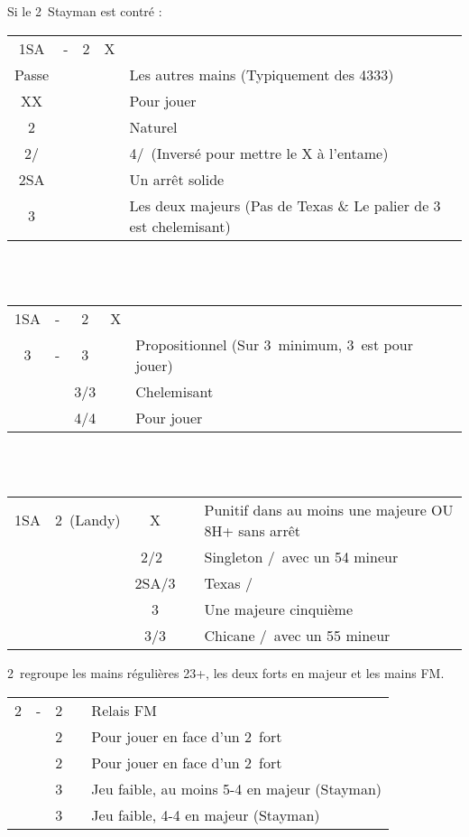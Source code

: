 \documentclass[a4paper, oneside, 11pt]{report}
\begin{document}
		Si le 2\trefle\ Stayman est contré :\\
		\begin{tabular}{cccc|l}
		1SA & - & 2\trefle & X &\\
		Passe &&&& Les autres mains (Typiquement des 4333)\\
		XX &&&& Pour jouer\\
		2\carreau &&&& Naturel\\
		2\coeur/\pique &&&& 4\pique/\coeur\ (Inversé pour mettre le X à l'entame)\\
		2SA &&&& Un arrêt solide\\
		3\trefle &&&& Les deux majeurs (Pas de Texas \& Le palier de 3 est chelemisant)\\
		\end{tabular}\\\\
		
		\begin{tabular}{cccc|l}
		1SA & - & 2\trefle & X &\\
		3\trefle & - & 3\carreau && Propositionnel (Sur 3\coeur\ minimum, 3\pique\ est pour jouer)\\
		&& 3\coeur/3\pique && Chelemisant\\
		&& 4\coeur/4\pique && Pour jouer\\
		\end{tabular}\\\\
		
		\begin{tabular}{cccc|l}
		1SA & 2\trefle\ (Landy) & X && Punitif dans au moins une majeure OU 8H+ sans arrêt\\
		&& 2\coeur/2\pique\ && Singleton \coeur/\pique\ avec un 54 mineur\\
		&& 2SA/3\trefle && Texas \trefle/\carreau\\
		&& 3\carreau && Une majeure cinquième\\
		&& 3\coeur/3\pique && Chicane \pique/\coeur\ avec un 55 mineur\\
		\end{tabular}

	2\trefle\ regroupe les mains régulières 23+, les deux forts en majeur et les mains FM.\\
	
	\begin{tabular}{cccc|l}
	2\trefle & - & 2\carreau && Relais FM\\
	&& 2\coeur && Pour jouer en face d'un 2\coeur\ fort\\
	&& 2\pique && Pour jouer en face d'un 2\pique\ fort\\
	&& 3\trefle && Jeu faible, au moins 5-4 en majeur (Stayman)\\
	&& 3\carreau && Jeu faible, 4-4 en majeur (Stayman)\\
	\end{tabular}\\\\
	
\end{document}
